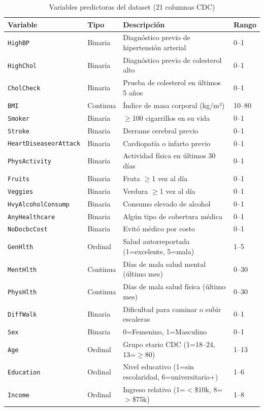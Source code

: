 \documentclass[12pt,a4paper]{article}
\begin{document}
\begin{table}[H]
  \centering
  \caption{Variables predictoras del dataset (21 columnas CDC)}
  \label{tab:variables}
  \small
  \begin{tabularx}{\linewidth}{llXl}
    \toprule
    \textbf{Variable} & \textbf{Tipo} & \textbf{Descripción} & \textbf{Rango}\\
    \midrule
    \texttt{HighBP} & Binaria & Diagnóstico previo de hipertensión arterial & 0–1\\
    \texttt{HighChol} & Binaria & Diagnóstico previo de colesterol alto & 0–1\\
    \texttt{CholCheck} & Binaria & Prueba de colesterol en últimos 5 años & 0–1\\
    \texttt{BMI} & Continua & Índice de masa corporal (kg/m²) & 10–80\\
    \texttt{Smoker} & Binaria & $\geq$100 cigarrillos en su vida & 0–1\\
    \texttt{Stroke} & Binaria & Derrame cerebral previo & 0–1\\
    \texttt{HeartDiseaseorAttack} & Binaria & Cardiopatía o infarto previo & 0–1\\
    \texttt{PhysActivity} & Binaria & Actividad física en últimos 30 días & 0–1\\
    \texttt{Fruits} & Binaria & Fruta $\geq$1 vez al día & 0–1\\
    \texttt{Veggies} & Binaria & Verdura $\geq$1 vez al día & 0–1\\
    \texttt{HvyAlcoholConsump} & Binaria & Consumo elevado de alcohol & 0–1\\
    \texttt{AnyHealthcare} & Binaria & Algún tipo de cobertura médica & 0–1\\
    \texttt{NoDocbcCost} & Binaria & Evitó médico por costo & 0–1\\
    \texttt{GenHlth} & Ordinal & Salud autorreportada (1=excelente, 5=mala) & 1–5\\
    \texttt{MentHlth} & Continua & Días de mala salud mental (último mes) & 0–30\\
    \texttt{PhysHlth} & Continua & Días de mala salud física (último mes) & 0–30\\
    \texttt{DiffWalk} & Binaria & Dificultad para caminar o subir escaleras & 0–1\\
    \texttt{Sex} & Binaria & 0=Femenino, 1=Masculino & 0–1\\
    \texttt{Age} & Ordinal & Grupo etario CDC (1=18–24, 13=$\geq$80) & 1–13\\
    \texttt{Education} & Ordinal & Nivel educativo (1=sin escolaridad, 6=universitario+) & 1–6\\
    \texttt{Income} & Ordinal & Ingreso relativo (1=$<$\$10k, 8=$>$\$75k) & 1–8\\
    \bottomrule
  \end{tabularx}
\end{table}
\end{document}
